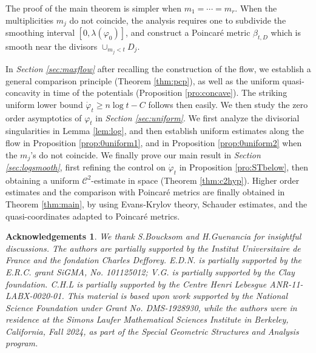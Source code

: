 \documentclass[11pt]{amsart}
\numberwithin{equation}{section}
\newtheorem*{ackn}{Acknowledgements}
\newcommand{\f}{\varphi}
\newcommand \la {\lambda}
\begin{document}

The proof of the main theorem is simpler when $m_1=\cdots=m_r$.
When the multiplicities $m_j$ do not coincide, the analysis requires one to subdivide
the smoothing interval $[0,\la(\f_0)]$, and construct a Poincaré metric 
$\beta_{t,D}$ which is smooth near the divisors $\cup_{m_j < t} D_j$.
 

\smallskip
 
 In {\it Section \ref{sec:maxflow}}
 after recalling the construction of the flow,
 we  establish a general comparison principle (Theorem \ref{thm:pcp}),
 as well as the uniform quasi-concavity in time of the potentials (Proposition \ref{pro:concave}).
  The striking uniform lower bound 
 $\dot{\f}_t \geq n \log t -C$ follows then easily.
  We then study the zero order asymptotics of $\f_t$ in  {\it Section \ref{sec:uniform}}.
 We first analyze the divisorial singularities in Lemma \ref{lem:log}, and then establish 
 uniform estimates along the flow in Proposition \ref{prop:0uniform1}, and 
 in Proposition \ref{prop:0uniform2} when the $m_j$'s do not coincide.
  We finally prove our main result in {\it Section \ref{sec:logsmooth}}, first 
 refining the control on $\dot{\f}_t$ in Proposition \ref{pro:STbelow}, then
 obtaining a uniform ${\mathcal C}^2$-estimate in space (Theorem \ref{thm:c2hyp}).
Higher order estimates and
the comparison with Poincaré metrics are finally obtained in Theorem \ref{thm:main},
by using Evans-Krylov theory, Schauder estimates, and the quasi-coordinates adapted to Poincaré metrics.
 
 

\begin{ackn} 
We thank S.Boucksom and H.Guenancia for insightful discussions.
The authors are partially supported by the Institut Universitaire de France
and the fondation Charles Defforey. 
E.D.N. is partially supported by the E.R.C. grant SiGMA, No. 101125012;
V.G. is partially supported by the Clay foundation. C.H.L is partially supported by the Centre Henri Lebesgue ANR-11-LABX-0020-01.
This material is based upon work supported by the National Science Foundation under Grant No. DMS-1928930, while the authors were in residence at the Simons Laufer Mathematical Sciences Institute in Berkeley, California, Fall 2024,
as part of the Special Geometric Structures and Analysis program.  
\end{ackn}
\end{document}
